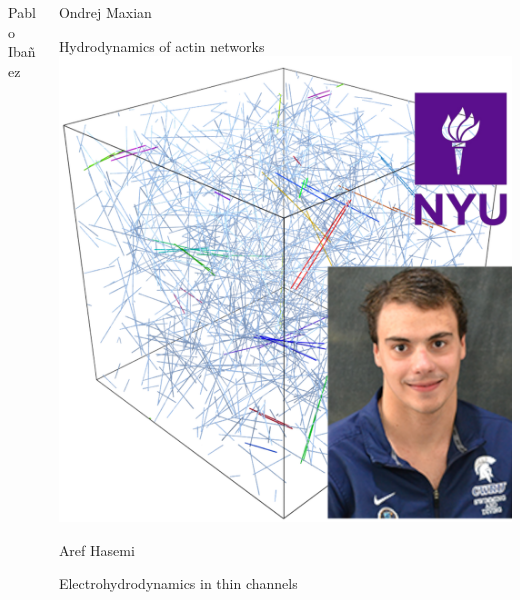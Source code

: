 \documentclass[xcolor=dvipsnames, compress]{beamer}
\begin{document}
\begin{frame}
\begin{columns}[T]
\begin{column}{0.32\linewidth}
\begin{block}{Pablo Ibañez}
\begin{center}
        \end{center}
      \end{block}
    \end{column}
    \begin{column}{0.32\linewidth}
      \begin{block}{Ondrej Maxian}
        \begin{center}
          \scriptsize Hydrodynamics of actin networks\newline
          \includegraphics[height=0.27\paperheight]{ondrejlink}
        \end{center}
      \end{block}
      \vspace*{-7pt}
      \begin{block}{Aref Hasemi}
        \begin{center}
          \scriptsize Electrohydrodynamics in thin channels\newline

\end{center}
\end{block}
\end{column}
\end{columns}
\end{frame}
\end{document}
